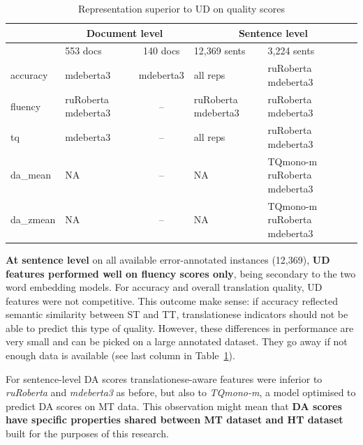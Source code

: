 \begin{table}[H]
	\centering
	\begin{tabular}{l|p{2cm}c||p{3cm}p{3cm}}
		\toprule
		& \multicolumn{2}{c||}{Document level} & \multicolumn{2}{c}{Sentence level} \\
		\midrule
		& 553 docs & 140 docs   & 12,369 sents & 3,224 sents  \\
		\midrule
		accuracy   & mdeberta3 & mdeberta3 & all reps & ruRoberta mdeberta3 \\
		fluency    & ruRoberta mdeberta3 & -- & ruRoberta mdeberta3 & ruRoberta mdeberta3 \\
		tq         & mdeberta3 & -- & all reps & ruRoberta mdeberta3 \\
		\midrule
		da\_mean   & NA & -- & NA & TQmono-m ruRoberta mdeberta3 \\
		da\_zmean  & NA & -- & NA & TQmono-m ruRoberta mdeberta3 \\
		\bottomrule
	\end{tabular}
	\caption{\label{tab:_ud_vs_all}Representation superior to UD on quality scores}
\end{table}

\textbf{At sentence level} on all available error-annotated instances (12,369), \textbf{UD features performed well on fluency scores only}, being secondary to the two word embedding models. For accuracy and overall translation quality, UD features were not competitive. This outcome make sense: if accuracy reflected semantic similarity between ST and TT, translationese indicators should not be able to predict this type of quality. However, these differences in performance are very small and can be picked on a large annotated dataset. They go away if not enough data is available (see last column in Table~\ref{tab:_ud_vs_all}).

For sentence-level DA scores translationese-aware features were inferior to \textit{ruRoberta} and \textit{mdeberta3} as before, but also to \textit{TQmono-m}, a model optimised to predict DA scores on MT data. This observation might mean that \textbf{DA scores have specific properties shared between MT dataset and HT dataset} built for the purposes of this research. 

